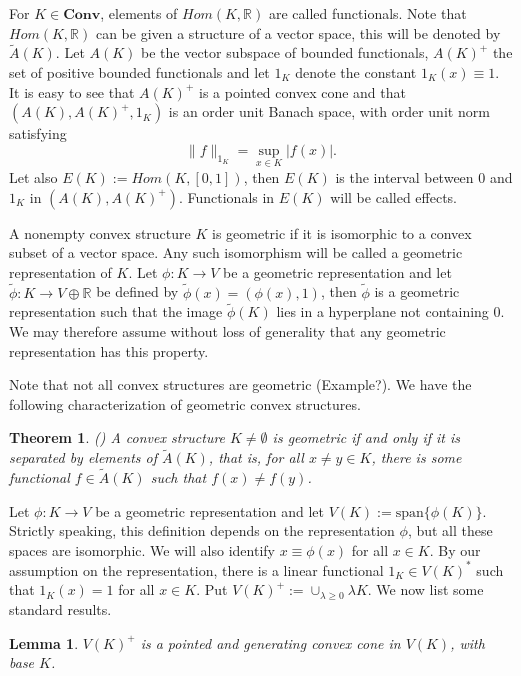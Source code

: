 \documentclass[12pt]{article}
\newtheorem{lemma}{Lemma}
\newtheorem{thm}{Theorem}
\theoremstyle{remark}
\newcommand{\<}{\langle}
\newcommand{\ct}[1]{\mathbf{#1}}
\begin{document}
For $K\in \ct{Conv}$, elements of $Hom(K,\mathbb R)$ are called functionals. Note that $Hom(K,\mathbb R)$ can be given a structure of a vector space, this will be denoted by $\widetilde A(K)$.  Let $A(K)$ be the vector subspace of bounded functionals, $A(K)^+$ the set of positive bounded functionals and let $1_K$ denote the constant $1_K(x)\equiv 1$. It is easy to see that $A(K)^+$ is a pointed convex cone and that $(A(K),A(K)^+,1_K)$ is an  order unit Banach space, with order unit norm satisfying
\[
\|f\|_{1_K}=\sup_{x\in K} |f(x)|.
\]
Let also $E(K):=Hom(K,[0,1])$, then $E(K)$ is the interval between 0 and $1_K$ in $(A(K),A(K)^+)$. Functionals in  $E(K)$ will be called effects.





A nonempty convex structure $K$ is geometric if it is isomorphic to a convex subset of a vector space. Any such isomorphism will be called a geometric representation of $K$.
Let $\phi:K\to V$ be a geometric representation and let $\tilde \phi:K\to V\oplus \mathbb R$ be defined by $\tilde \phi(x)=(\phi(x),1)$, then $\tilde \phi$ is a geometric 
representation  such that the image $\tilde \phi(K)$ lies in a hyperplane not containing 0. We may therefore assume without loss of generality  that any geometric representation has this property.

 Note that not all convex structures are geometric (Example?). We have the following characterization of geometric convex structures.
\begin{thm}(\cite[Thm. 2.2]{gudder}) \label{thm:gudder} A convex structure $K\neq \emptyset$ is geometric if and only if it is separated by elements of $\widetilde A(K)$, 
that is, for all $x\ne y\in K$, there is some functional $f\in \widetilde A(K)$ such that $f(x)\ne f(y)$. 
\end{thm}


Let $\phi:K\to V$ be a geometric representation and let $V(K):=\mathrm{span}\{\phi(K)\}$. Strictly speaking, this definition depends on the representation $\phi$, but all
 these  spaces  are isomorphic. We will also identify $x\equiv \phi(x)$ for all $x\in K$. By our assumption on the representation, there is a linear functional $1_K\in V(K)^*$ such that 
 $1_K(x)=1$ for all $x\in K$. Put $V(K)^+:=\cup_{\lambda\ge 0} \lambda K$. We now list some standard results.

\begin{lemma} %
$V(K)^+$ is a pointed and generating convex cone in $V(K)$, with base $K$.

\end{lemma}
\end{document}
